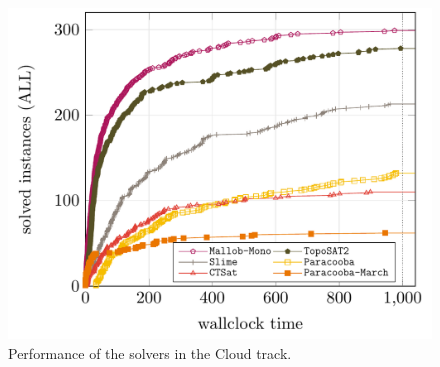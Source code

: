 \documentclass{elsarticle}
\begin{document}
\begin{figure}
\centering
\includegraphics[width=.9\textwidth]{img/cloud-ALL.pdf}
\caption{Performance of the solvers in the Cloud track.}
\label{fig:res-cloud}
\end{figure}
\end{document}
